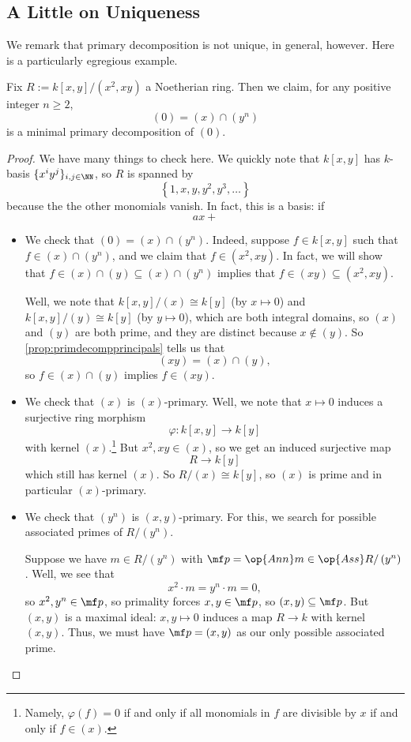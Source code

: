 \subsection{A Little on Uniqueness}
We remark that primary decomposition is not unique, in general, however. Here is a particularly egregious example.
\begin{exe}
	Fix $R:=k[x,y]/\left(x^2,xy\right)$ a Noetherian ring. Then we claim, for any positive integer $n\ge2$,
	\[(0)=(x)\cap\left(y^n\right)\]
	is a minimal primary decomposition of $(0)$.
\end{exe}
\begin{proof}
	We have many things to check here. We quickly note that $k[x,y]$ has $k$-basis $\{x^iy^j\}_{i,j\in\NN}$, so $R$ is spanned by
	\[\left\{1,x,y,y^2,y^3,\ldots\right\}\]
	because the the other monomials vanish. In fact, this is a basis: if
	\[ax+\]
	\begin{itemize}
		\item We check that $(0)=(x)\cap\left(y^n\right)$. Indeed, suppose $f\in k[x,y]$ such that $f\in(x)\cap\left(y^n\right)$, and we claim that $f\in\left(x^2,xy\right)$. In fact, we will show that $f\in(x)\cap(y)\subseteq(x)\cap\left(y^n\right)$ implies that $f\in(xy)\subseteq\left(x^2,xy\right)$.
		
		Well, we note that $k[x,y]/(x)\cong k[y]$ (by $x\mapsto0$) and $k[x,y]/(y)\cong k[y]$ (by $y\mapsto0$), which are both integral domains, so $(x)$ and $(y)$ are both prime, and they are distinct because $x\notin(y)$. So \autoref{prop:primdecompprincipals} tells us that
		\[(xy)=(x)\cap(y),\]
		so $f\in(x)\cap(y)$ implies $f\in(xy)$.

		\item We check that $(x)$ is $(x)$-primary. Well, we note that $x\mapsto0$ induces a surjective ring morphism
		\[\varphi:k[x,y]\to k[y]\]
		with kernel $(x)$.\footnote{Namely, $\varphi(f)=0$ if and only if all monomials in $f$ are divisible by $x$ if and only if $f\in(x)$.} But $x^2,xy\in(x)$, so we get an induced surjective map
		\[R\to k[y]\]
		which still has kernel $(x)$. So $R/(x)\cong k[y]$, so $(x)$ is prime and in particular $(x)$-primary.

		\item We check that $\left(y^n\right)$ is $(x,y)$-primary. For this, we search for possible associated primes of $R/\left(y^n\right)$.
		
		Suppose we have $m\in R/\left(y^n\right)$ with $\mf p=\op{Ann}m\in\op{Ass}R/\left(y^n\right)$. Well, we see that
		\[x^2\cdot m=y^n\cdot m=0,\]
		so $x^2,y^n\in\mf p$, so primality forces $x,y\in\mf p$, so $(x,y)\subseteq\mf p$. But $(x,y)$ is a maximal ideal: $x,y\mapsto0$ induces a map $R\to k$ with kernel $(x,y)$. Thus, we must have $\mf p=(x,y)$ as our only possible associated prime.


\end{itemize}
\end{proof}
